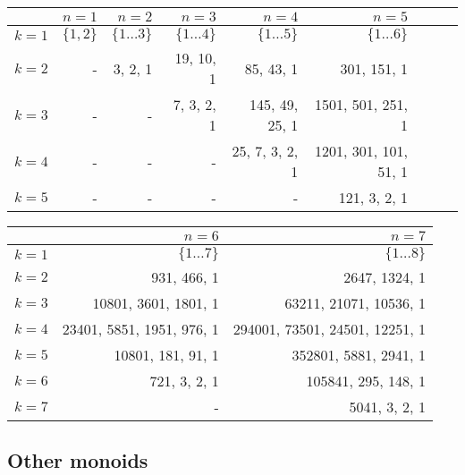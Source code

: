 \begin{table}[h]
  \centering
  \begin{tabular}{|r|r|r|r|r|r|r|r|r|}
    \hline
    & $n=1$ & $n=2$ & $n=3$ & $n=4$ & $n=5$ \\ \hline
    $k=1$ & $\{1, 2\}$ & $\{1\dots 3\}$ & $\{1\dots 4\}$ & $\{1\dots 5\}$ & $\{1\dots 6\}$ \\
    $k=2$ & - & 3, 2, 1 & 19, 10, 1 & 85, 43, 1 & 301, 151, 1 \\
    $k=3$ & - & - & 7, 3, 2, 1 & 145, 49, 25, 1 & 1501, 501, 251, 1 \\
    $k=4$ & - & - & - & 25, 7, 3, 2, 1 & 1201, 301, 101, 51, 1 \\
    $k=5$ & - & - & - & - & 121, 3, 2, 1 \\
    \hline
  \end{tabular}
\end{table}

\begin{table}[h]
  \centering
  \begin{tabular}{|r|r|r|}
    \hline
    & $n=6$ & $n=7$ \\ \hline
    $k=1$ & $\{1\dots 7\}$ & $\{1\dots 8\}$ \\
    $k=2$ & 931, 466, 1 & 2647, 1324, 1 \\
    $k=3$ & 10801, 3601, 1801, 1 & 63211, 21071, 10536, 1 \\
    $k=4$ & 23401, 5851, 1951, 976, 1 & 294001, 73501, 24501, 12251, 1 \\
    $k=5$ & 10801, 181, 91, 1 & 352801, 5881, 2941, 1 \\
    $k=6$ & 721, 3, 2, 1 & 105841, 295, 148, 1 \\
    $k=7$ & - & 5041, 3, 2, 1 \\
    \hline
  \end{tabular}
\end{table}

\subsection{Other monoids}
